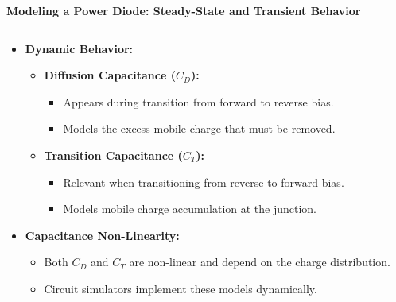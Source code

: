 \begin{frame}{\textbf{Modeling a Power Diode: Steady-State and Transient Behavior}}
    \begin{columns}
        \begin{column}{0.48\textwidth}
\begin{itemize}
\item \textbf{Dynamic Behavior:}
\begin{itemize}
    \item \textbf{Diffusion Capacitance ($C_D$):} 
        \begin{itemize}
            \item Appears during transition from forward to reverse bias.
            \item Models the excess mobile charge that must be removed.
        \end{itemize}
        
    \item \textbf{Transition Capacitance ($C_T$):}
        \begin{itemize}
            \item Relevant when transitioning from reverse to forward bias.
            \item Models mobile charge accumulation at the junction.
        \end{itemize}
\end{itemize}

\item \textbf{Capacitance Non-Linearity:}
    \begin{itemize}
        \item Both $C_D$ and $C_T$ are non-linear and depend on the charge distribution.
        \item Circuit simulators implement these models dynamically.
    \end{itemize}
\end{itemize}
\end{column}


\end{columns}
\end{frame}
